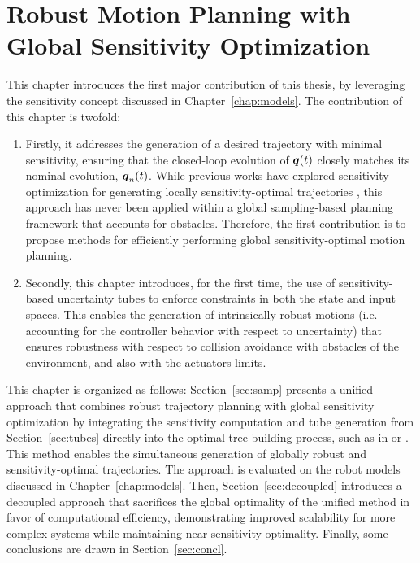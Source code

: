 \chapter{Robust Motion Planning with Global Sensitivity Optimization}\label{chap:samp}
\localtableofcontents \newpage

This chapter introduces the first major contribution of this thesis, by leveraging the sensitivity concept discussed in Chapter~\ref{chap:models}.
The contribution of this chapter is twofold:
\begin{enumerate}
    \item Firstly, it addresses the generation of a desired trajectory with minimal sensitivity, ensuring that the closed-loop evolution of $\boldsymbol{q}(t)$ closely matches its nominal evolution, $\boldsymbol{q}_n(t)$. 
    While previous works have explored sensitivity optimization for generating locally sensitivity-optimal trajectories \cite{cPi,cTh}, this approach has never been applied within a global sampling-based planning framework that accounts for obstacles. 
    Therefore, the first contribution is to propose methods for efficiently performing global sensitivity-optimal motion planning.
    \item Secondly, this chapter introduces, for the first time, the use of sensitivity-based uncertainty tubes to enforce constraints in both the state and input spaces. 
    This enables the generation of intrinsically-robust motions (i.e. accounting for the controller behavior with respect to uncertainty) that ensures robustness with respect to collision avoidance with obstacles of the environment, and also with the actuators limits.
\end{enumerate}
This chapter is organized as follows: Section~\ref{sec:samp} presents a unified approach that combines robust trajectory planning with global sensitivity optimization by integrating the sensitivity computation and tube generation from Section~\ref{sec:tubes} directly into the optimal tree-building process, such as in  or . 
This method enables the simultaneous generation of globally robust and sensitivity-optimal trajectories. 
The approach is evaluated on the robot models discussed in Chapter~\ref{chap:models}.
Then, Section~\ref{sec:decoupled} introduces a decoupled approach that sacrifices the global optimality of the unified method in favor of computational efficiency, demonstrating improved scalability for more complex systems while maintaining near sensitivity optimality.
Finally, some conclusions are drawn in Section~\ref{sec:concl}.

